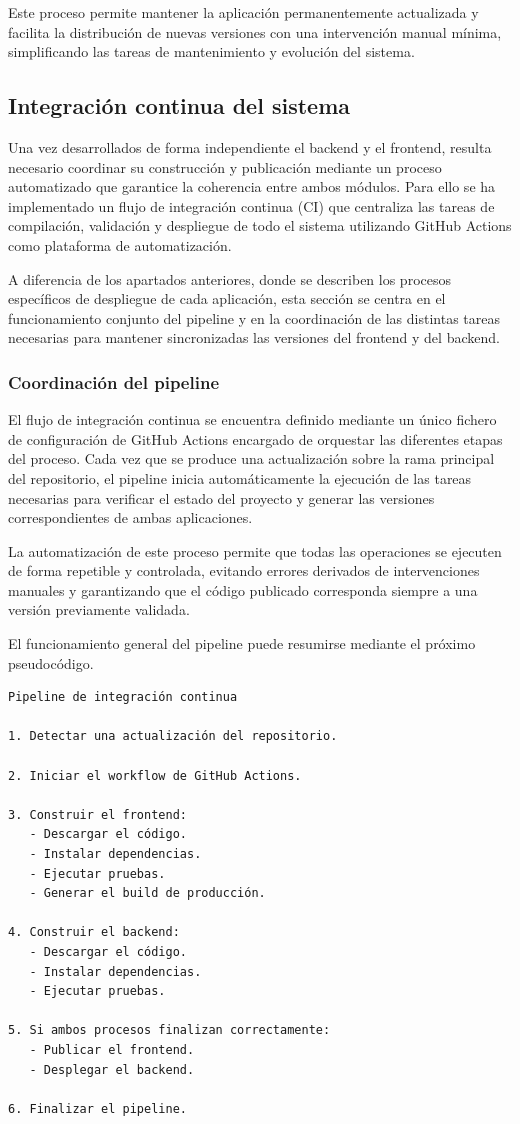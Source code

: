Este proceso permite mantener la aplicación permanentemente actualizada y facilita la distribución de nuevas versiones con una intervención manual mínima, simplificando las tareas de mantenimiento y evolución del sistema.
\subsection{Integración continua del sistema}
\label{subsec:cicd}

Una vez desarrollados de forma independiente el backend y el frontend, resulta necesario coordinar su construcción y publicación mediante un proceso automatizado que garantice la coherencia entre ambos módulos. Para ello se ha implementado un flujo de integración continua (CI) que centraliza las tareas de compilación, validación y despliegue de todo el sistema utilizando GitHub Actions como plataforma de automatización.

A diferencia de los apartados anteriores, donde se describen los procesos específicos de despliegue de cada aplicación, esta sección se centra en el funcionamiento conjunto del pipeline y en la coordinación de las distintas tareas necesarias para mantener sincronizadas las versiones del frontend y del backend.

\subsubsection{Coordinación del pipeline}

El flujo de integración continua se encuentra definido mediante un único fichero de configuración de GitHub Actions encargado de orquestar las diferentes etapas del proceso. Cada vez que se produce una actualización sobre la rama principal del repositorio, el pipeline inicia automáticamente la ejecución de las tareas necesarias para verificar el estado del proyecto y generar las versiones correspondientes de ambas aplicaciones.

La automatización de este proceso permite que todas las operaciones se ejecuten de forma repetible y controlada, evitando errores derivados de intervenciones manuales y garantizando que el código publicado corresponda siempre a una versión previamente validada.

El funcionamiento general del pipeline puede resumirse mediante el próximo pseudocódigo.

\begin{Verbatim}[frame=single, fontsize=\small]
Pipeline de integración continua

1. Detectar una actualización del repositorio.

2. Iniciar el workflow de GitHub Actions.

3. Construir el frontend:
   - Descargar el código.
   - Instalar dependencias.
   - Ejecutar pruebas.
   - Generar el build de producción.

4. Construir el backend:
   - Descargar el código.
   - Instalar dependencias.
   - Ejecutar pruebas.

5. Si ambos procesos finalizan correctamente:
   - Publicar el frontend.
   - Desplegar el backend.

6. Finalizar el pipeline.
\end{Verbatim}

